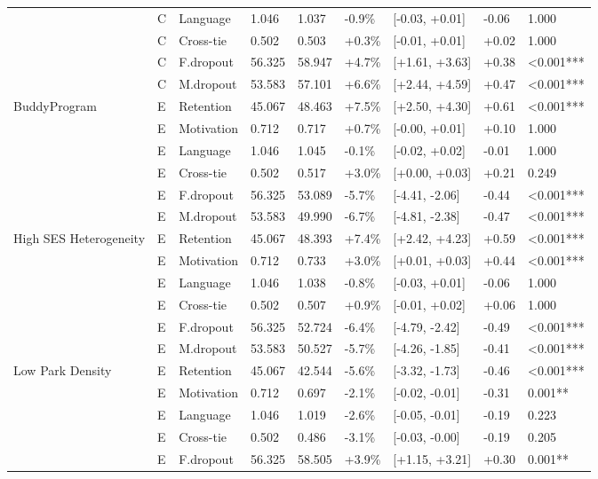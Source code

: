 \begin{longtable}[t]{lllllllll}
  & C & Language & 1.046 & 1.037 & -0.9\% & [-0.03, +0.01] & -0.06 & 1.000\\
  & C & Cross-tie & 0.502 & 0.503 & +0.3\% & [-0.01, +0.01] & +0.02 & 1.000\\
  & C & F.dropout & 56.325 & 58.947 & +4.7\% & [+1.61, +3.63] & +0.38 & <0.001***\\
  & C & M.dropout & 53.583 & 57.101 & +6.6\% & [+2.44, +4.59] & +0.47 & <0.001***\\
\midrule
BuddyProgram & E & Retention & 45.067 & 48.463 & +7.5\% & [+2.50, +4.30] & +0.61 & <0.001***\\
  & E & Motivation & 0.712 & 0.717 & +0.7\% & [-0.00, +0.01] & +0.10 & 1.000\\
  & E & Language & 1.046 & 1.045 & -0.1\% & [-0.02, +0.02] & -0.01 & 1.000\\
  & E & Cross-tie & 0.502 & 0.517 & +3.0\% & [+0.00, +0.03] & +0.21 & 0.249\\
  & E & F.dropout & 56.325 & 53.089 & -5.7\% & [-4.41, -2.06] & -0.44 & <0.001***\\
  & E & M.dropout & 53.583 & 49.990 & -6.7\% & [-4.81, -2.38] & -0.47 & <0.001***\\
\midrule
High SES Heterogeneity & E & Retention & 45.067 & 48.393 & +7.4\% & [+2.42, +4.23] & +0.59 & <0.001***\\
  & E & Motivation & 0.712 & 0.733 & +3.0\% & [+0.01, +0.03] & +0.44 & <0.001***\\
  & E & Language & 1.046 & 1.038 & -0.8\% & [-0.03, +0.01] & -0.06 & 1.000\\
  & E & Cross-tie & 0.502 & 0.507 & +0.9\% & [-0.01, +0.02] & +0.06 & 1.000\\
  & E & F.dropout & 56.325 & 52.724 & -6.4\% & [-4.79, -2.42] & -0.49 & <0.001***\\
  & E & M.dropout & 53.583 & 50.527 & -5.7\% & [-4.26, -1.85] & -0.41 & <0.001***\\
\midrule
Low Park Density & E & Retention & 45.067 & 42.544 & -5.6\% & [-3.32, -1.73] & -0.46 & <0.001***\\
  & E & Motivation & 0.712 & 0.697 & -2.1\% & [-0.02, -0.01] & -0.31 & 0.001**\\
  & E & Language & 1.046 & 1.019 & -2.6\% & [-0.05, -0.01] & -0.19 & 0.223\\
  & E & Cross-tie & 0.502 & 0.486 & -3.1\% & [-0.03, -0.00] & -0.19 & 0.205\\
  & E & F.dropout & 56.325 & 58.505 & +3.9\% & [+1.15, +3.21] & +0.30 & 0.001**\\

\end{longtable}
